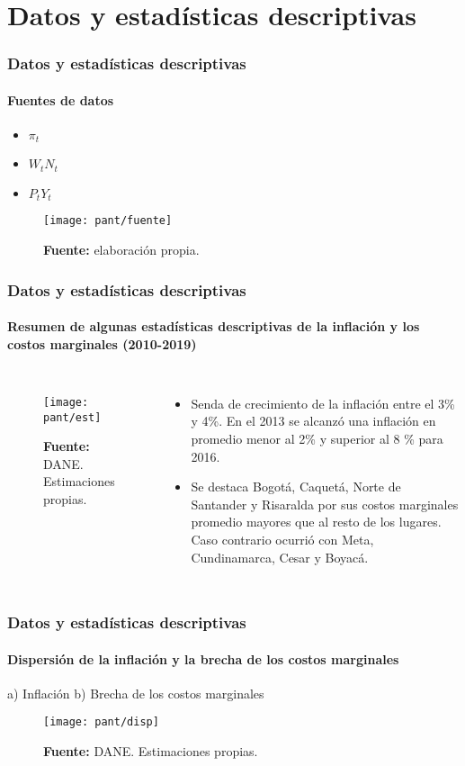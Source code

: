 \documentclass[10pt]{beamer}
\begin{document}
\section{Datos y estadísticas descriptivas}
\begin{frame}
\frametitle{Datos y estadísticas descriptivas}
\framesubtitle{Fuentes de datos}
\begin{itemize}
\item<1-> $\pi_{t}$
\item<2-> $W_{t}N_{t}$
\item<3-> $P_{t}Y_{t}$
\end{itemize}

\begin{figure}
\texttt{[image: pant/fuente]}
\centering
\label{fig:ejemplo}\\
  \raggedright  \tiny \textbf{Fuente:} elaboración propia. 
\end{figure}
\end{frame}

\begin{frame}
\frametitle{Datos y estadísticas descriptivas}
\framesubtitle{Resumen de algunas estadísticas descriptivas de la inflación y los costos marginales (2010-2019)}
\begin{columns}[c]
\begin{figure}
\texttt{[image: pant/est]}
\centering
\label{fig:ejemplo}\\
  \raggedright  \tiny \textbf{Fuente:} DANE. Estimaciones propias.
\end{figure} 

\begin{itemize}
\justifying
\item<1-> Senda de crecimiento de la inflación entre el  3\% y 4\%. En el 2013 se alcanzó una inflación en promedio menor al 2\% y superior al 8 \% para 2016.
\item<2-> Se destaca  Bogotá, Caquetá, Norte de Santander y Risaralda por sus costos marginales promedio mayores que al resto de los lugares. Caso contrario ocurrió con Meta, Cundinamarca, Cesar y Boyacá.
\end{itemize}

\end{columns}
\end{frame}

\begin{frame}
\frametitle{Datos y estadísticas descriptivas}
\framesubtitle{Dispersión de la inflación y la brecha de los costos marginales}
a) Inflación         \hspace*{4cm}                       b) Brecha de los costos marginales
\begin{figure}
\texttt{[image: pant/disp]}
\centering
\label{fig:ejemplo}\\
  \raggedright  \tiny \textbf{Fuente:} DANE. Estimaciones propias.
\end{figure}
\end{frame} 
\end{document}
